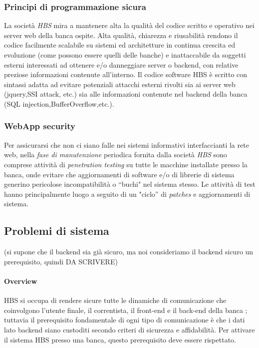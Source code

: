 	\subsubsection{Principi di programmazione sicura}

La società \emph{HBS} mira a mantenere alta la qualità del codice scritto e operativo nei server web della banca ospite. Alta qualità, chiarezza e riusabilità rendono il codice facilmente scalabile su sistemi ed architetture in continua crescita ed evoluzione (come possono essere quelli delle banche) e inattaccabile da soggetti esterni interessati ad ottenere e/o danneggiare server o backend, con relative preziose informazioni contenute all'interno.
 Il codice software HBS è scritto con sintassi adatta ad evitare potenziali attacchi esterni rivolti sia ai server web (jquery,SSI attack, etc.) sia alle informazioni contenute nel backend della banca (SQL injection,BufferOverflow,etc.).

	\subsubsection{WebApp security}
Per assicurarsi che non ci siano falle nei sistemi informativi interfaccianti la rete web, nella \emph{fase di manutenzione} periodica fornita dalla società \emph{HBS}  sono comprese attività di \emph{penetration testing} su tutte le macchine installate presso la banca, onde evitare che aggiornamenti di software e/o di librerie di sistema generino pericolose incompatibilità o ``buchi" nel sistema stesso. Le attività di test hanno principalmente luogo a seguito di un "ciclo'' di \emph{patches} e aggiornamenti di sistema.





\subsection{Problemi di sistema }
(si supone che il backend sia già sicuro, ma noi consideriamo il backend sicuro un prerequisito, quindi DA SCRIVERE)
\paragraph{Overview}	HBS si occupa di rendere sicure tutte le dinamiche di comunicazione che coinvolgono l'utente finale, il correntista, il front-end e il back-end della banca ; tuttavia il prerequisito fondamentale di ogni tipo di comunicazione è che i dati lato backend siano custoditi secondo criteri di sicurezza e affidabilità. Per attivare il sistema HBS presso una banca, questo prerequisito deve essere rispettato.

















